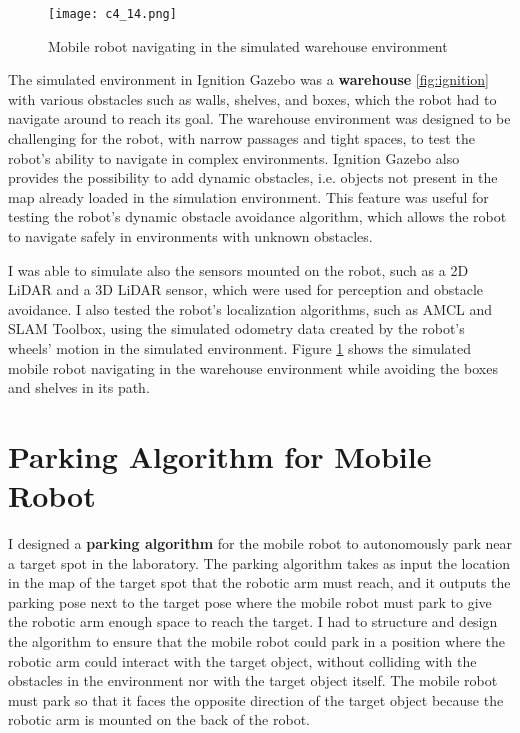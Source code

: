 \begin{figure}[t]
    \centering
    \texttt{[image: c4\_14.png]}
    \caption{Mobile robot navigating in the simulated warehouse environment}
    \label{fig:warehousenav2}
\end{figure}

The simulated environment in Ignition Gazebo was a \textbf{warehouse} \ref{fig:ignition} 
with various obstacles such as walls, shelves, and boxes,
which the robot had to navigate around to reach its goal. The warehouse environment was designed to be challenging
for the robot, with narrow passages and tight spaces, to test the robot's ability to navigate in complex environments.
Ignition Gazebo also provides the possibility to add dynamic obstacles, i.e. objects not present in the map
already loaded in the simulation environment. This feature was useful for testing the robot's dynamic obstacle avoidance
algorithm, which allows the robot to navigate safely in environments with unknown obstacles.

I was able to simulate also the sensors mounted on the robot, such as a 2D LiDAR and a 3D LiDAR sensor, which were used
for perception and obstacle avoidance. I also tested the robot's localization algorithms, such as AMCL and SLAM Toolbox,
using the simulated odometry data created by the robot's wheels' motion in the simulated environment. Figure 
\ref{fig:warehousenav2} shows the simulated mobile robot navigating in the warehouse environment
while avoiding the boxes and shelves in its path.


\section{Parking Algorithm for Mobile Robot}

I designed a \textbf{parking algorithm} for the mobile robot to autonomously park near a target spot in the laboratory.
The parking algorithm takes as input the location in the map of the target spot that the robotic arm must reach,
and it outputs the parking pose next to the target pose where the mobile robot must park to give the robotic arm
enough space to reach the target. I had to structure and design the algorithm to ensure that the mobile robot
could park in a position where the robotic arm could interact with the target object, without colliding with 
the obstacles in the environment nor with the target object itself. The mobile robot must park so that it 
faces the opposite direction of the target object because the robotic arm is mounted on the back of the robot.

